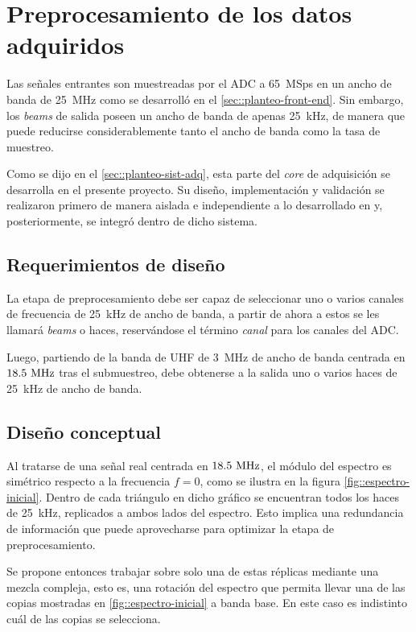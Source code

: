 \documentclass[../../main.tex]{subfiles}
\begin{document}
\graphicspath{{./figures}}
\chapter{Preprocesamiento de los datos adquiridos}
Las señales entrantes son muestreadas por el ADC a 65~MSps en un ancho de banda de 25~MHz como se desarrolló en el \cref{sec::planteo-front-end}. Sin embargo, los \textit{beams} de salida poseen un ancho de banda de apenas 25~kHz, de manera que puede reducirse considerablemente tanto el ancho de banda como la tasa de muestreo.

Como se dijo en el \cref{sec::planteo-sist-adq}, esta parte del \textit{core} de adquisición se desarrolla en el presente proyecto. Su diseño, implementación y validación se realizaron primero de manera aislada e independiente a lo desarrollado en \cite{proyecto-jose} y, posteriormente, se integró dentro de dicho sistema.

\section{Requerimientos de diseño}
La etapa de preprocesamiento debe ser capaz de seleccionar uno o varios canales de frecuencia de 25~kHz de ancho de banda, a partir de ahora a estos se les llamará \textit{beams} o haces, reservándose el término \textit{canal} para los canales del ADC.

Luego, partiendo de la banda de UHF de 3~MHz de ancho de banda centrada en $18.5~\textrm{MHz}$ tras el submuestreo, debe obtenerse a la salida uno o varios haces de 25~kHz de ancho de banda.

\section{Diseño conceptual}
Al tratarse de una señal real centrada en $18.5~\textrm{MHz}$, el módulo del espectro es simétrico respecto a la frecuencia $f = 0$, como se ilustra en la figura \ref{fig::espectro-inicial}. Dentro de cada triángulo en dicho gráfico se encuentran todos los haces de 25~kHz, replicados a ambos lados del espectro. Esto implica una redundancia de información que puede aprovecharse para optimizar la etapa de preprocesamiento.

Se propone entonces trabajar sobre solo una de estas réplicas mediante una mezcla compleja, esto es, una rotación del espectro  que permita llevar una de las copias mostradas en \ref{fig::espectro-inicial} a banda base. En este caso es indistinto cuál de las copias se selecciona. 
\end{document}
